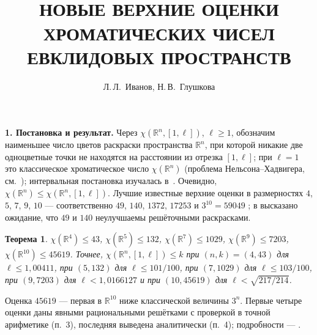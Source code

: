 \documentclass{article}
\newcommand{\R}{\mathbb{R}}
\newtheorem{theorem}{Теорема}
\begin{document}
\title{\\[8pt]
\bf\large\MakeUppercase{%
Новые верхние оценки хроматических чисел евклидовых пространств
}}

\author{Л.\,Л.~Иванов, Н.\,В.~Глушкова}
\date{}

\maketitle

\makeatletter
\renewcommand{\@makefnmark}{}
\makeatother

\textbf{1. Постановка и результат.}
Через $\chi(\R^n,[1,\ell])$, $\ell\ge1$, обозначим наименьшее число цветов
раскраски пространства $\R^n$, при которой никакие две одноцветные точки не
находятся на расстоянии из отрезка $[1,\ell]$; при $\ell=1$ это классическое
хроматическое число $\chi(\R^n)$ (проблема Нельсона--Хадвигера, см.~\cite{Soifer});
интервальная постановка изучалась в~\cite{Ivanov2011}. Очевидно,
$\chi(\R^n)\le\chi(\R^n,[1,\ell])$. Лучшие известные верхние оценки в
размерностях $4$, $5$, $7$, $9$, $10$ --- соответственно $49$, $140$, $1372$,
$17253$ и $3^{10}=59049$ \cite{ABPR}; в \cite{ABPR} высказано ожидание, что
$49$ и $140$ неулучшаемы решёточными раскрасками.

\begin{theorem}
$\chi(\R^4)\le43$, $\chi(\R^5)\le132$, $\chi(\R^7)\le1029$,
$\chi(\R^9)\le7203$, $\chi(\R^{10})\le45619$. Точнее,
$\chi(\R^n,[1,\ell])\le k$ при $(n,k)=(4,43)$ для $\ell\le1{,}00411$,
при $(5,132)$ для $\ell\le101/100$, при $(7,1029)$ для $\ell\le103/100$,
при $(9,7203)$ для $\ell<1{,}0166127$ и при $(10,45619)$ для
$\ell<\sqrt{217/214}$.
\end{theorem}

Оценка $45619$ --- первая в $\R^{10}$ ниже классической величины $3^n$.
Первые четыре оценки даны явными рациональными решётками с проверкой в
точной арифметике (п.~3), последняя выведена аналитически (п.~4); подробности
--- \cite{Full}.
\end{document}
